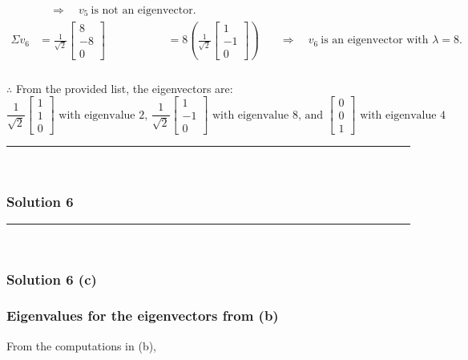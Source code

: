 \documentclass{article}
\begin{document}
{\begin{align*}
&\quad\Longrightarrow\quad v_5\ \text{is not an eigenvector}.\\[6pt]
\Sigma v_6 &= \frac{1}{\sqrt{2}}\begin{bmatrix}8\\-8\\0\end{bmatrix}&
&= 8\left(\frac{1}{\sqrt{2}}\begin{bmatrix}1\\-1\\0\end{bmatrix}\right)
&\quad\Longrightarrow\quad v_6\ \text{is an eigenvector with }\lambda=8.
\end{align*}

\subsubsection*{\normalfont}{$\therefore$ From the provided list, the eigenvectors are:}
$$\dfrac{1}{\sqrt{2}}\begin{bmatrix}1\\1\\0\end{bmatrix}\text{ with eigenvalue } 2\text{, } \dfrac{1}{\sqrt{2}}\begin{bmatrix}1\\-1\\0\end{bmatrix}\text{ with eigenvalue }8\text{, and }\begin{bmatrix}0\\0\\1\end{bmatrix} \text{ with eigenvalue } 4$$

\noindent\rule{\textwidth}{0.4pt}\\

\newpage

\subsubsection*{Solution 6}
\noindent\rule{\textwidth}{0.4pt}\\
\subsubsection*{Solution 6 (c)}
\subsubsection*{Eigenvalues for the eigenvectors from (b)}
From the computations in (b),

}
\end{document}
